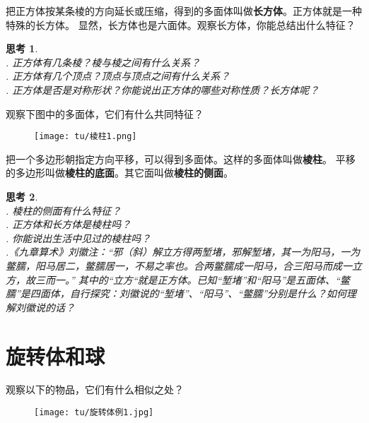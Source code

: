 \documentclass[12pt,UTF8]{ctexbook}
\theoremstyle{definition}
\theoremstyle{plain}
\newtheorem{sk}{思考}[section]
\begin{document}
把正方体按某条棱的方向延长或压缩，得到的多面体叫做\textbf{长方体}。正方体就是一种特殊的长方体。
显然，长方体也是六面体。观察长方体，你能总结出什么特征？

\begin{sk}
    \mbox{}\\
    . 正方体有几条棱？棱与棱之间有什么关系？\\
    . 正方体有几个顶点？顶点与顶点之间有什么关系？\\
    . 正方体是否是对称形状？你能说出正方体的哪些对称性质？长方体呢？
\end{sk}

观察下图中的多面体，它们有什么共同特征？

\begin{figure}[h] %
    \vspace{4pt}
    \centering
    \texttt{[image: tu/棱柱1.png]}
\end{figure}

把一个多边形朝指定方向平移，可以得到多面体。这样的多面体叫做\textbf{棱柱}。
平移的多边形叫做\textbf{棱柱的底面}。其它面叫做\textbf{棱柱的侧面}。

\begin{sk}
    \mbox{}\\
    . 棱柱的侧面有什么特征？\\
    . 正方体和长方体是棱柱吗？\\
    . 你能说出生活中见过的棱柱吗？\\
    .《九章算术》刘徽注：“邪（斜）解立方得两堑堵，邪解堑堵，其一为阳马，一为鳖臑，阳马居二，鳖臑居一，不易之率也。合两鳖臑成一阳马，合三阳马而成一立方，故三而一。”
    其中的“立方“就是正方体。已知“堑堵”和“阳马”是五面体、“鳖臑”是四面体，自行探究：刘徽说的“堑堵”、“阳马”、“鳖臑”分别是什么？如何理解刘徽说的话？
\end{sk}

\section{旋转体和球}

观察以下的物品，它们有什么相似之处？

\begin{figure}[h] %
    \vspace{4pt}
    \centering
    \texttt{[image: tu/旋转体例1.jpg]}
\end{figure}
\end{document}
